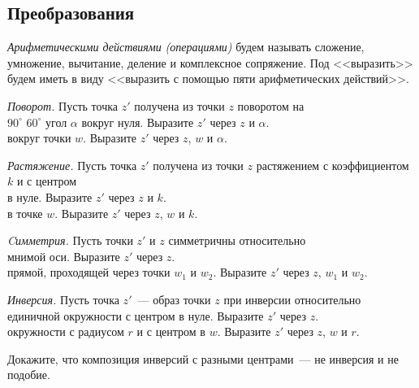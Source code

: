 


\subsection*{Преобразования}

\emph{Арифметическими действиями}
\emph{(операциями)}
будем называть сложение, умножение, вычитание, деление и комплексное
сопряжение.
Под <<выразить>> будем иметь в виду
<<выразить с помощью пяти арифметических действий>>.

\begin{problems}

\item
\emph{Поворот.}
Пусть точка $z'$ получена из точки $z$ поворотом на
\\
\sbp
$90^\circ$
\quad
\sbp
$60^\circ$
\quad
\sbp
угол $\alpha$
\quad
вокруг нуля. Выразите $z'$ через $z$ и $\alpha$.
\\
\sbp вокруг точки $w$.  Выразите $z'$ через $z$, $w$ и $\alpha$.

\item
\emph{Растяжение.}
Пусть точка $z'$ получена из точки $z$ растяжением с коэффициентом $k$ и с
центром
\\
\sbp в нуле. Выразите $z'$ через $z$ и $k$.
\\
\sbp в точке $w$. Выразите $z'$ через $z$, $w$ и $k$.

\item
\emph{Cимметрия.}
Пусть точки $z'$ и $z$ симметричны относительно
\\
\sbp
мнимой оси.
Выразите $z'$ через $z$.
\\
\sbp
прямой, проходящей через точки $w_1$ и $w_2$.
Выразите $z'$ через $z$, $w_1$ и $w_2$.

\item
\emph{Инверсия.}
Пусть точка $z'$~--- образ точки $z$ при инверсии относительно
\\
\sbp
единичной окружности с центром в нуле.
Выразите $z'$ через $z$.
\\
\sbp
окружности с радиусом $r$ и с центром в $w$.
Выразите $z'$ через $z$, $w$ и $r$.

\item
Докажите, что композиция инверсий с разными центрами~--- не инверсия и не
подобие.

\end{problems}

